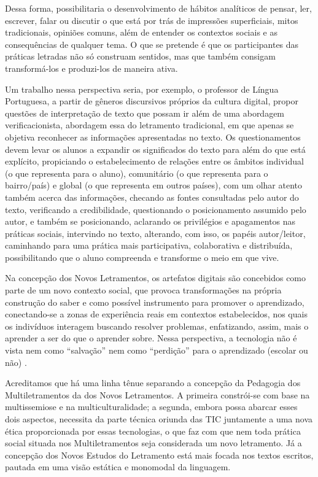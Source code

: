 \documentclass{textolivre}
\begin{document}
Dessa forma, possibilitaria o desenvolvimento de hábitos analíticos de pensar,
ler, escrever, falar ou discutir o que está por trás de impressões
superficiais, mitos tradicionais, opiniões comuns, além de entender os
contextos sociais e as consequências de qualquer tema. O que se pretende é que
os participantes das práticas letradas não só construam sentidos, mas que
também consigam transformá-los e produzi-los de maneira ativa.

Um trabalho nessa perspectiva seria, por exemplo, o professor de Língua
Portuguesa, a partir de gêneros discursivos próprios da cultura digital, propor
questões de interpretação de texto que possam ir além de uma abordagem
verificacionista, abordagem essa do letramento tradicional, em que apenas se
objetiva reconhecer as informações apresentadas no texto. Os questionamentos
devem levar os alunos a expandir os significados do texto para além do que está
explícito, propiciando o estabelecimento de relações entre os âmbitos
individual (o que representa para o aluno), comunitário (o que representa para
o bairro/país) e global (o que representa em outros países), com um olhar
atento também acerca das informações, checando as fontes consultadas pelo autor
do texto, verificando a credibilidade, questionando o posicionamento assumido
pelo autor, e também se posicionando, aclarando os privilégios e apagamentos
nas práticas sociais, intervindo no texto, alterando, com isso, os papéis
autor/leitor, caminhando para uma prática mais participativa, colaborativa e
distribuída, possibilitando que o aluno compreenda e transforme o meio em que
vive. 

Na concepção dos Novos Letramentos, os artefatos digitais são concebidos como
parte de um novo contexto social, que provoca transformações na própria
construção do saber e como possível instrumento para promover o aprendizado,
conectando-se a zonas de experiência reais em contextos estabelecidos, nos
quais os indivíduos interagem buscando resolver problemas, enfatizando, assim,
mais o aprender a ser do que o aprender sobre. Nessa perspectiva, a tecnologia
não é vista nem como “salvação” nem como “perdição” para o aprendizado (escolar
ou não) \cite{knobel2007}.

Acreditamos que há uma linha tênue separando a concepção da Pedagogia dos
Multiletramentos da dos Novos Letramentos. A primeira constrói-se com base na
multissemiose e na multiculturalidade; a segunda, embora possa abarcar esses
dois aspectos, necessita da parte técnica oriunda das TIC juntamente a uma nova
ética proporcionada por essas tecnologias, o que faz com que nem toda prática
social situada nos Multiletramentos seja considerada um novo letramento. Já a
concepção dos Novos Estudos do Letramento está mais focada nos textos escritos,
pautada em uma visão estática e monomodal da linguagem.
\end{document}

